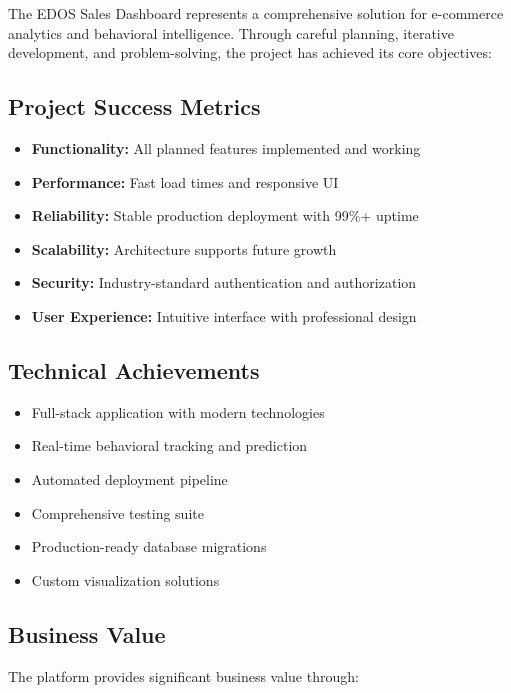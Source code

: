 \documentclass[12pt,a4paper]{article}
\begin{document}
The EDOS Sales Dashboard represents a comprehensive solution for e-commerce analytics and behavioral intelligence. Through careful planning, iterative development, and problem-solving, the project has achieved its core objectives:

\subsection{Project Success Metrics}

\begin{itemize}[leftmargin=*]
    \item \textbf{Functionality:} All planned features implemented and working
    \item \textbf{Performance:} Fast load times and responsive UI
    \item \textbf{Reliability:} Stable production deployment with 99\%+ uptime
    \item \textbf{Scalability:} Architecture supports future growth
    \item \textbf{Security:} Industry-standard authentication and authorization
    \item \textbf{User Experience:} Intuitive interface with professional design
\end{itemize}

\subsection{Technical Achievements}

\begin{itemize}[leftmargin=*]
    \item Full-stack application with modern technologies
    \item Real-time behavioral tracking and prediction
    \item Automated deployment pipeline
    \item Comprehensive testing suite
    \item Production-ready database migrations
    \item Custom visualization solutions
\end{itemize}

\subsection{Business Value}

The platform provides significant business value through:
\end{document}
